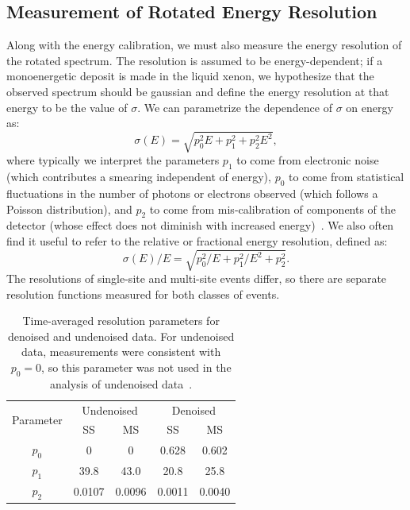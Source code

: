 \subsection{Measurement of Rotated Energy Resolution}\label{sec:RotatedEnergyResMeasurement}

Along with the energy calibration, we must also measure the energy resolution of the rotated spectrum.  The resolution is assumed to be energy-dependent; if a monoenergetic deposit is made in the liquid xenon, we hypothesize that the observed spectrum should be gaussian and define the energy resolution at that energy to be the value of $\sigma$.  We can parametrize the dependence of $\sigma$ on energy as:
\begin{equation}
\sigma(E) = \sqrt{p_0^2 E + p_1^2 + p_2^2 E^2},
\end{equation}
where typically we interpret the parameters $p_1$ to come from electronic noise (which contributes a smearing independent of energy), $p_0$ to come from statistical fluctuations in the number of photons or electrons observed (which follows a Poisson distribution), and $p_2$ to come from mis-calibration of components of the detector (whose effect does not diminish with increased energy)~\cite{knoll2000radiation}.  We also often find it useful to refer to the relative or fractional energy resolution, defined as:
\begin{equation}
\sigma(E)/E = \sqrt{p_0^2/E + p_1^2/E^2 + p_2^2}.
\end{equation}
The resolutions of single-site and multi-site events differ, so there are separate resolution functions measured for both classes of events.

\begin{table}
\begin{center}
\begin{tabular}{|c|c|c|c|c|}
\hline \multirow{2}{*}{Parameter} & \multicolumn{2}{|c|}{Undenoised} & \multicolumn{2}{|c|}{Denoised}\\
\cline{2-5}& SS & MS & SS & MS \\
\hline $p_0$ & 0 & 0 & 0.628 & 0.602 \\
\hline $p_1$ & 39.8 & 43.0 & 20.8 & 25.8 \\
\hline $p_2$ & 0.0107 & 0.0096 & 0.0011 & 0.0040 \\ \hline
\end{tabular}
\end{center}
\caption{Time-averaged resolution parameters for denoised and undenoised data.  For undenoised data, measurements were consistent with $p_0 = 0$, so this parameter was not used in the analysis of undenoised data~\cite{AverageEnergyResolutionDocument}.}
\label{tab:ResolutionFunctions}
\end{table}

